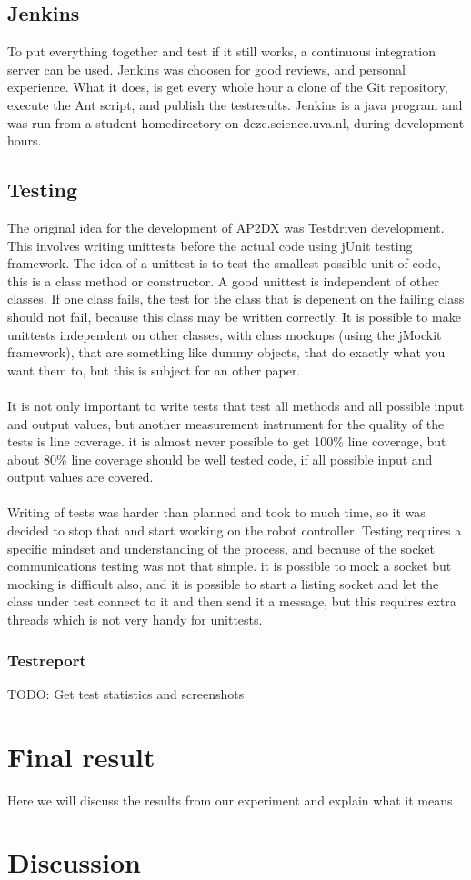 \documentclass[titlepage, a4paper,10pt]{article}
\begin{document}
\subsection{Jenkins}
To put everything together and test if it still works, a continuous integration server can be used. Jenkins was choosen for good reviews, and personal experience. What it does, is get every whole hour a clone of the Git repository, execute the Ant script, and publish the testresults. Jenkins is a java program and was run from a student homedirectory on deze.science.uva.nl, during development hours.

\subsection{Testing}
The original idea for the development of AP2DX was Testdriven development. This involves writing unittests before the actual code using jUnit testing framework. The idea of a unittest is to test the smallest possible unit of code, this is a class method or constructor. A good unittest is independent of other classes. If one class fails, the test for the class that is depenent on the failing class should not fail, because this class may be written correctly. It is possible to make unittests independent on other classes, with class mockups (using the jMockit framework), that are something like dummy objects, that do exactly what you want them to, but this is subject for an other paper.
\\\\
It is not only important to write tests that test all methods and all possible input and output values, but another measurement instrument for the quality of the tests is line coverage. it is almost never possible to get 100\% line coverage, but about 80\% line coverage should be well tested code, if all possible input and output values are covered.
\\\\
Writing of tests was harder than planned and took to much time, so it was decided to stop that and start working on the robot controller. Testing requires a specific mindset and understanding of the process, and because of the socket communications testing was not that simple. it is possible to mock a socket but mocking is difficult also, and it is possible to start a listing socket and let the class under test connect to it and then send it a message, but this requires extra threads which is not very handy for unittests.

\subsubsection{Testreport}
TODO: Get test statistics and screenshots

\newpage

\section{Final result}
Here we will discuss the results from our experiment and explain what it means

\newpage

\section{Discussion}

\end{document}
